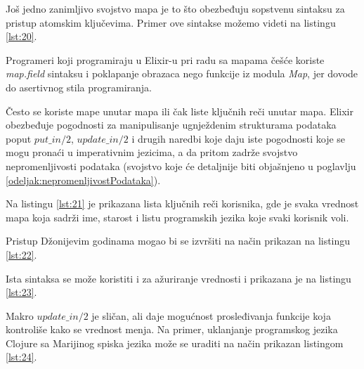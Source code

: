 \documentclass[12pt,oneside]{memoir}
\begin{document}


Još jedno zanimljivo svojstvo mapa je to što obezbeđuju sopstvenu sintaksu za pristup atomskim ključevima. Primer ove sintakse možemo videti na listingu \ref{lst:20}.



\noindent Programeri koji programiraju u Elixir-u pri radu sa mapama češće koriste \textit{map.field} sintaksu i poklapanje obrazaca nego funkcije iz modula \textit{Map}, jer dovode do asertivnog stila programiranja.

Često se koriste mape unutar mapa ili čak liste ključnih reči unutar mapa. Elixir obezbeđuje pogodnosti za manipulisanje ugnježdenim strukturama podataka poput $put\_in/2$, $update\_in/2$ i drugih naredbi koje daju iste pogodnosti koje se mogu pronaći u imperativnim jezicima, a da pritom zadrže svojstvo nepromenljivosti podataka (svojstvo koje će detaljnije biti objašnjeno u poglavlju \ref{odeljak:nepromenljivostPodataka}).

Na listingu \ref{lst:21} je prikazana lista ključnih reči korisnika, gde je svaka vrednost mapa koja sadrži ime, starost i listu programskih jezika koje svaki korisnik voli.



\noindent Pristup Džonijevim godinama mogao bi se izvršiti na način prikazan na listingu \ref{lst:22}.



\noindent Ista sintaksa se može koristiti i za ažuriranje vrednosti i prikazana je na listingu \ref{lst:23}.



Makro $update\_in/2$ je sličan, ali daje mogućnost prosleđivanja funkcije koja kontroliše kako se vrednost menja. Na primer, uklanjanje programskog jezika Clojure sa Marijinog spiska jezika može se uraditi na način prikazan listingom \ref{lst:24}.


\end{document}

